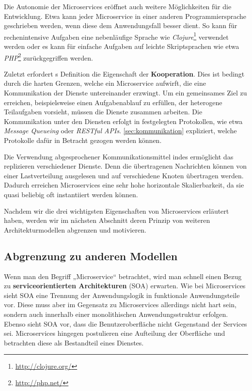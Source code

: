 Die Autonomie der Microservices eröffnet auch weitere Möglichkeiten für die Entwicklung. Etwa kann jeder Microservice in einer anderen Programmiersprache geschrieben werden, wenn diese dem Anwendungsfall besser dient. So kann für rechenintensive Aufgaben eine nebenläufige Sprache wie \textit{Clojure}\footnote{\url{http://clojure.org/}} verwendet werden oder es kann für einfache Aufgaben auf leichte Skriptsprachen wie etwa \textit{PHP}\footnote{\url{http://php.net/}} zurückgegriffen werden.

Zuletzt erfordert \citeauthor{newman2015}s Definition die Eigenschaft der \textbf{Kooperation}. Dies ist bedingt durch die harten Grenzen, welche ein Microservice aufwirft, die eine Kommunikation der Dienste untereinander erzwingt. Um ein gemeinsames Ziel zu erreichen, beispielsweise einen Aufgabenablauf zu erfüllen, der heterogene Teilaufgaben vorsieht, müssen die Dienste zusammen arbeiten. Die Kommunikation unter den Diensten erfolgt in festgelegten Protokollen, wie etwa \textit{Message Queueing} oder \textit{RESTful APIs}. \autoref{sec:kommunikation} expliziert, welche Protokolle dafür in Betracht gezogen werden können.

Die Verwendung abgesprochener Kommunikationsmittel indes ermöglicht das replizieren verschiedener Dienste. Denn die übertragenen Nachrichten können von einer Lastverteilung ausgelesen und auf verschiedene Knoten übertragen werden. Dadurch erreichen Microservices eine sehr hohe horizontale Skalierbarkeit, da sie quasi beliebig oft instantiiert werden können.

Nachdem wir die drei wichtigsten Eigenschaften von Microservices erläutert haben, werden wir im nächsten Abschnitt deren Prinzip von weiteren Architekturmodellen abgrenzen und motivieren.

\subsection{Abgrenzung zu anderen Modellen}
\label{subsec:abgrenzung}

Wenn man den Begriff „Microservice“ betrachtet, wird man schnell einen Bezug zu \textbf{serviceorientierten Architekturen} (SOA) erwarten. Wie bei Microservices sieht SOA eine Trennung der Anwendungslogik in funktionale Anwendungsteile vor. Diese muss aber im Gegensatz zu Microservices allerdings nicht hart sein, sondern auch innerhalb einer monolithischen Anwendungsstruktur erfolgen. Ebenso sieht SOA vor, dass die Benutzeroberfläche nicht Gegenstand der Services sei. Microservices hingegen postulieren eine Aufteilung der Oberfläche und betrachten diese als Bestandteil eines Dienstes.

